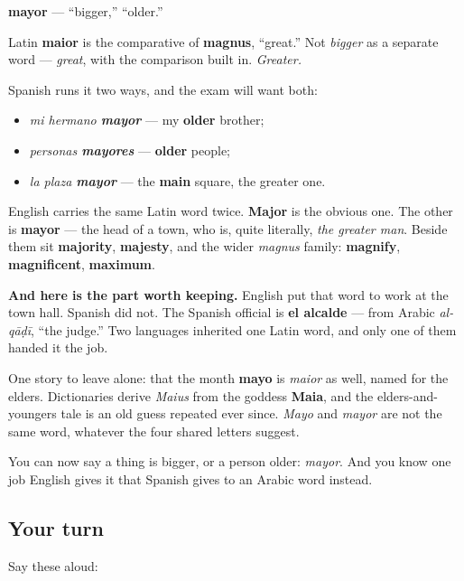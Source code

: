 \begin{cousinweb}
\textbf{mayor} — \textquotedblleft{}bigger,\textquotedblright{} \textquotedblleft{}older.\textquotedblright{}

Latin \textbf{maior} is the comparative of \textbf{magnus}, \textquotedblleft{}great.\textquotedblright{} Not \emph{bigger} as a separate word — \emph{great}, with the comparison built in. \emph{Greater.}

Spanish runs it two ways, and the exam will want both:

\begin{itemize}
\raggedright
  \item \emph{mi hermano \textbf{mayor}} — my \textbf{older} brother;
  \item \emph{personas \textbf{mayores}} — \textbf{older} people;
  \item \emph{la plaza \textbf{mayor}} — the \textbf{main} square, the greater one.
\end{itemize}

English carries the same Latin word twice. \textbf{Major} is the obvious one. The other is \textbf{mayor} — the head of a town, who is, quite literally, \emph{the greater man}. Beside them sit \textbf{majority}, \textbf{majesty}, and the wider \emph{magnus} family: \textbf{magnify}, \textbf{magnificent}, \textbf{maximum}.

\textbf{And here is the part worth keeping.} English put that word to work at the town hall. Spanish did not. The Spanish official is \textbf{el alcalde} — from Arabic \emph{al-qāḍī}, \textquotedblleft{}the judge.\textquotedblright{} Two languages inherited one Latin word, and only one of them handed it the job.

One story to leave alone: that the month \textbf{mayo} is \emph{maior} as well, named for the elders. Dictionaries derive \emph{Maius} from the goddess \textbf{Maia}, and the elders-and-youngers tale is an old guess repeated ever since. \emph{Mayo} and \emph{mayor} are not the same word, whatever the four shared letters suggest.
\end{cousinweb}

\begin{grammarlens}[title={What you've built}]
You can now say a thing is bigger, or a person older: \emph{mayor}. And you know one job English gives it that Spanish gives to an Arabic word instead.
\end{grammarlens}

\subsection*{Your turn}
Say these aloud:

